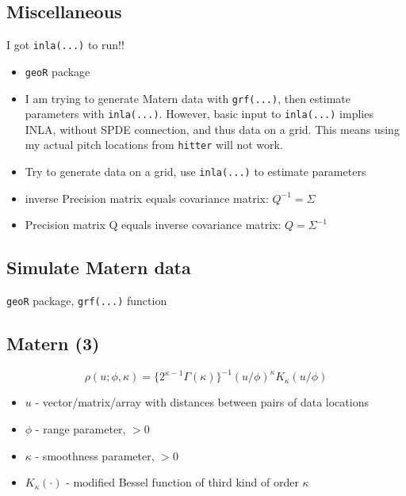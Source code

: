 \documentclass{article}
\begin{document}
\subsection*{Miscellaneous}
I got \verb|inla(...)| to run!!
\begin{itemize}
\item \verb|geoR| package
\item I am trying to generate Matern data with \verb|grf(...)|, then estimate parameters with \verb|inla(...)|. However, basic input to \verb|inla(...)| implies INLA, without SPDE connection, and thus data on a grid. This means using my actual pitch locations from \verb|hitter| will not work. \\
\item Try to generate data on a grid, use \verb|inla(...)| to estimate parameters
\item inverse Precision matrix equals covariance matrix: $Q^{-1} = \Sigma$
\item Precision matrix Q equals inverse covariance matrix: $Q = \Sigma^{-1}$
\end{itemize}

\subsection*{Simulate Matern data}
\verb|geoR| package, \verb|grf(...)| function
\subsection*{Matern (3)}
$$ \rho(u; \phi, \kappa) = \{2^{\kappa-1}\Gamma(\kappa)\}^{-1}(u/\phi)^{\kappa}K_{\kappa}(u/\phi)$$
  \begin{itemize}
  \item $u$ - vector/matrix/array with distances between pairs of data locations
  \item $\phi$ - range parameter, $>0$
  \item $\kappa$ - smoothness parameter, $>0$
  \item $K_{\kappa}(\cdot)$ - modified Bessel function of third kind of order $\kappa$
  \end{itemize}
  
\end{document}
